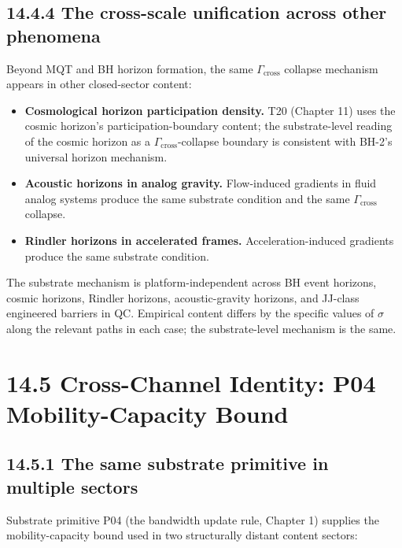 \documentclass[11pt]{book}
\begin{document}
\subsection{14.4.4 The cross-scale unification across other phenomena}

Beyond MQT and BH horizon formation, the same $\Gamma_\mathrm{cross}$ collapse mechanism appears in other closed-sector content:

\begin{itemize}
\item \textbf{Cosmological horizon participation density.} T20 (Chapter 11) uses the cosmic horizon's participation-boundary content; the substrate-level reading of the cosmic horizon as a $\Gamma_\mathrm{cross}$-collapse boundary is consistent with BH-2's universal horizon mechanism.
\item \textbf{Acoustic horizons in analog gravity.} Flow-induced gradients in fluid analog systems produce the same substrate condition and the same $\Gamma_\mathrm{cross}$ collapse.
\item \textbf{Rindler horizons in accelerated frames.} Acceleration-induced gradients produce the same substrate condition.
\end{itemize}

The substrate mechanism is platform-independent across BH event horizons, cosmic horizons, Rindler horizons, acoustic-gravity horizons, and JJ-class engineered barriers in QC. Empirical content differs by the specific values of $\sigma$ along the relevant paths in each case; the substrate-level mechanism is the same.

\section{14.5 Cross-Channel Identity: P04 Mobility-Capacity Bound}

\subsection{14.5.1 The same substrate primitive in multiple sectors}

Substrate primitive P04 (the bandwidth update rule, Chapter 1) supplies the mobility-capacity bound used in two structurally distant content sectors:
\end{document}
